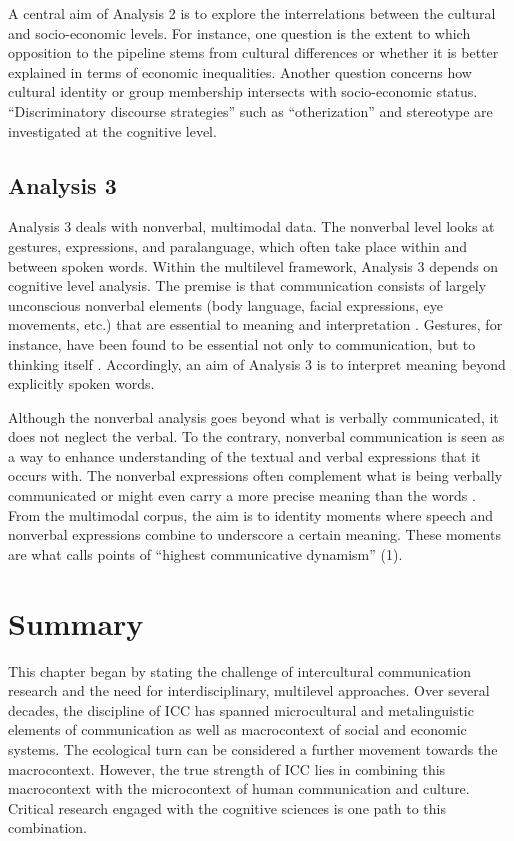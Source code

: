 A central aim of Analysis 2 is to explore the interrelations between the cultural and socio-economic levels. For instance, one question is the extent to which opposition to the pipeline stems from cultural differences or whether it is better explained in terms of economic inequalities. Another question concerns how cultural identity or group membership intersects with socio-economic status. ``Discriminatory discourse strategies'' \citep{Escamilla2013} such as ``otherization'' and stereotype are investigated at the cognitive level. 
     
\subsection{Analysis 3}

Analysis 3 deals with nonverbal, multimodal data. The nonverbal level looks at gestures, expressions, and paralanguage, which often take place within and between spoken words. Within the multilevel framework, Analysis 3 depends on cognitive level analysis. The premise is that communication consists of largely unconscious nonverbal elements (body language, facial expressions, eye movements, etc.) that are essential to meaning and interpretation \citep{Massaro1987}. Gestures, for instance, have been found to be essential not only to communication, but to thinking itself \citep{McNeill1992, McNeill2005b}. Accordingly, an aim of Analysis 3 is to interpret meaning beyond explicitly spoken words.     

Although the nonverbal analysis goes beyond what is verbally communicated, it does not neglect the verbal. To the contrary, nonverbal communication is seen as a way to enhance understanding of the textual and verbal expressions that it occurs with. The nonverbal expressions often complement what is being verbally communicated \citep{Kendon2004} or might even carry a more precise meaning than the words \citep[316]{Evans2001}. From the multimodal corpus, the aim is to identity moments where speech and nonverbal expressions combine to underscore a certain meaning. These moments are what \cite*{McNeill2005b} calls points of ``highest communicative dynamism'' (1).

\section{Summary}

This chapter began by stating the challenge of intercultural communication research and the need for interdisciplinary, multilevel approaches. Over several decades, the discipline of ICC has spanned microcultural and metalinguistic elements of communication as well as macrocontext of social and economic systems. The ecological turn can be considered a further movement towards the macrocontext. However, the true strength of ICC lies in combining this macrocontext with the microcontext of human communication and culture. Critical research engaged with the cognitive sciences is one path to this combination.

